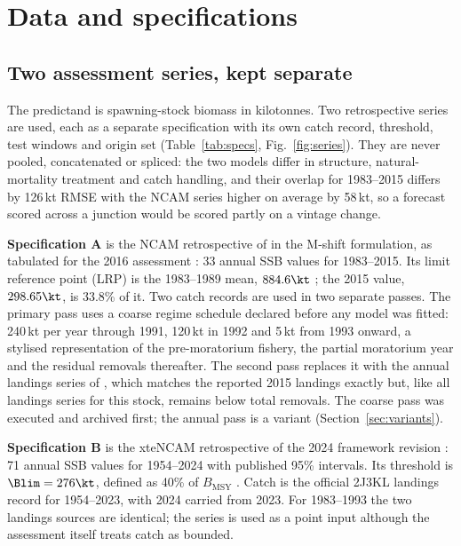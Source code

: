 \section{Data and specifications}\label{sec:data}

\subsection{Two assessment series, kept separate}\label{sec:specs}

The predictand is spawning-stock biomass in kilotonnes. Two retrospective series are used, each as a separate specification with its own catch record, threshold, test windows and origin set (Table~\ref{tab:specs}, Fig.~\ref{fig:series}). They are never pooled, concatenated or spliced: the two models differ in structure, natural-mortality treatment and catch handling, and their overlap for 1983--2015 differs by 126\,kt RMSE with the NCAM series higher on average by 58\,kt, so a forecast scored across a junction would be scored partly on a vintage change.

\textbf{Specification A} is the NCAM retrospective of \citet{Cadigan2016} in the M-shift formulation, as tabulated for the 2016 assessment \citep[Table A2]{DFO2016}: 33 annual SSB values for 1983--2015. Its limit reference point (LRP) is the 1983--1989 mean, $884.6\kt$ \citep{DFO2009,DFO2016}; the 2015 value, $298.65\kt$, is 33.8\% of it. Two catch records are used in two separate passes. The primary pass uses a coarse regime schedule declared before any model was fitted: 240\,kt per year through 1991, 120\,kt in 1992 and 5\,kt from 1993 onward, a stylised representation of the pre-moratorium fishery, the partial moratorium year and the residual removals thereafter. The second pass replaces it with the annual landings series of \citet{Schijns2021}, which matches the reported 2015 landings exactly but, like all landings series for this stock, remains below total removals. The coarse pass was executed and archived first; the annual pass is a variant (Section~\ref{sec:variants}).

\textbf{Specification B} is the xteNCAM retrospective of the 2024 framework revision \citep[Table 17]{Regular2025}: 71 annual SSB values for 1954--2024 with published 95\% intervals. Its threshold is $\Blim = 276\kt$, defined as 40\% of $B_{\mathrm{MSY}}$ \citep{DFO2024a}. Catch is the official 2J3KL landings record \citep[Table 1]{Regular2025} for 1954--2023, with 2024 carried from 2023. For 1983--1993 the two landings sources are identical; the series is used as a point input although the assessment itself treats catch as bounded.

